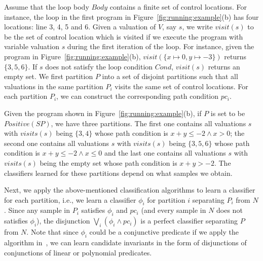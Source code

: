 Assume that the loop body $Body$ contains a finite set of control locations. For instance, the loop in the first program in Figure~\ref{fig:running:example}(b) has four locations: line 3, 4, 5 and 6. Given a valuation of $V$, say $s$, we write $visit(s)$ to be the set of control location which is visited if we execute the program with variable valuation $s$ during the first iteration of the loop. For instance, given the program in Figure~\ref{fig:running:example}(b), $visit(\{x \mapsto 0, y \mapsto -3\})$ returns $\{3,5,6\}$. If $s$ does not satisfy the loop condition $Cond$, $visit(s)$ returns an empty set. We first partition $P$ into a set of disjoint partitions such that all valuations in the same partition $P_i$ visits the same set of control locations. For each partition $P_i$, we can construct the corresponding path condition $pc_i$. 
\begin{example}
Given the program shown in Figure~\ref{fig:running:example}(b), if $P$ is set to be $Positive(SP)$, we have three partitions. The first one contains all valuations $s$ with $visits(s)$ being $\{3,4\}$ whose path condition is $x+y\leq -2 \land x > 0$; the second one contains all valuations $s$ with $visits(s)$ being $\{3,5,6\}$ whose path condition is $x+y\leq -2 \land x \leq 0$ and the last one contains all valuations $s$ with $visits(s)$ being the empty set whose path condition is $x+y > -2$.
The classifiers learned for these partitions depend on what samples we obtain.
\end{example}
Next, we apply the above-mentioned classification algorithms to learn a classifier for each partition, i.e., we learn a classifier $\phi_i$ for partition $i$ separating $P_i$ from $N$. Since any sample in $P_i$ satisfies $\phi_i$ and $pc_i$ (and every sample in $N$ does not satisfies $\phi_i$), the disjunction $\bigvee_i (\phi_i \land pc_i)$ is a perfect classifier separating $P$ from $N$. Note that since $\phi_i$ could be a conjunctive predicate if we apply the algorithm in~\cite{sharma2012interpolants}, we can learn candidate invariants in the form of disjunctions of conjunctions of linear or polynomial predicates.

